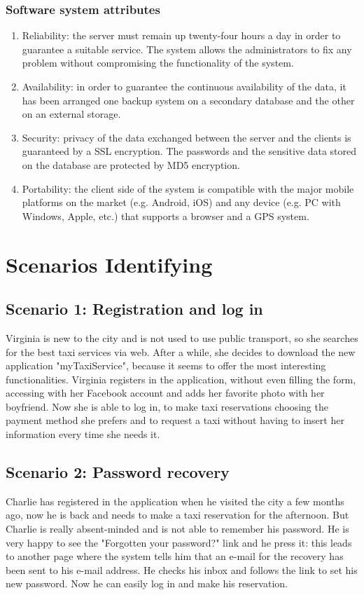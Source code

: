 \documentclass[18pt,oneside,a4paper, titlepage]{article}
\begin{document}
		\subsubsection{Software system attributes} 
			\begin{enumerate}
				\item Reliability: the server must remain up twenty-four hours a day in order to guarantee a suitable service. The system allows the administrators to fix any problem without compromising the functionality of the system.
				\item Availability: in order to guarantee the continuous availability of the data, it has been arranged one backup system on a secondary database and the other on an external storage. 
				\item Security: privacy of the data exchanged between the server and the clients is guaranteed by a SSL encryption. The passwords and the sensitive data stored on the database are protected by MD5 encryption.
				\item Portability: the client side of the system is compatible with the major mobile platforms on the market (e.g. Android, iOS) and any device (e.g. PC with Windows, Apple, etc.) that supports a browser and a GPS system.
			\end{enumerate}
\newpage
\section{Scenarios Identifying}
	\subsection{Scenario 1: Registration and log in}
		Virginia is new to the city and is not used to use public transport, so she searches for the best taxi services via web. After a while, she decides to download the new application "myTaxiService", because it seems to offer the most interesting functionalities. Virginia registers in the application, without even filling the form, accessing with her Facebook account and adds her favorite photo with her boyfriend. Now she is able to log in, to make taxi reservations choosing the payment method she prefers and to request a taxi without having to insert her information every time she needs it.
		
	\subsection{Scenario 2: Password recovery}
		Charlie has registered in the application when he visited the city a few months ago, now he is back and needs to make a taxi reservation for the afternoon. But Charlie is really absent-minded and is not able to remember his password. He is very happy to see the "Forgotten your password?" link and he press it: this leads to another page where the system tells him that an e-mail for the recovery has been sent to his e-mail address. He checks his inbox and follows the link to set his new password. Now he can easily log in and make his reservation.
		
\end{document}
